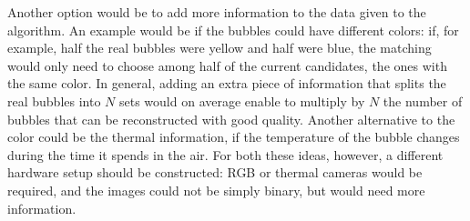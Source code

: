 Another option would be to add more information to the data given to the \match* algorithm.
An example would be if the bubbles could have different colors: if, for example, half the real bubbles were yellow and half were blue, the matching would only need to choose among half of the current candidates, the ones with the same color.
In general, adding an extra piece of information that splits the real bubbles into $N$ sets would on average enable to multiply by $N$ the number of bubbles that can be reconstructed with good quality.
Another alternative to the color could be the thermal information, if the temperature of the bubble changes during the time it spends in the air.
For both these ideas, however, a different hardware setup should be constructed: RGB or thermal cameras would be required, and the images could not be simply binary, but would need more information.
